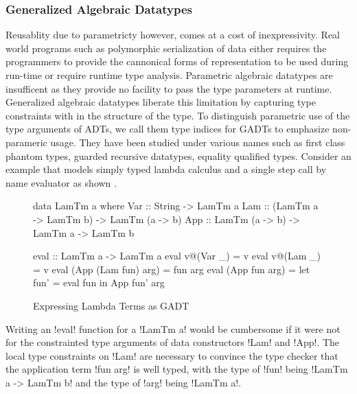 \documentclass[manuscript,screen,nonacm]{acmart}
\begin{document}
\subsubsection{Generalized Algebraic Datatypes}
Reusablity due to parametricty however, comes at a cost of inexpressivity. Real world programs such as polymorphic serialization of data either requires the programmers to provide the cannonical forms of representation \cite{herlihy_value_1982} to be used during run-time or require runtime type analysis\cite{harper_compiling_1995}. Parametric algebraic datatypes are insufficent as they provide no facility to pass the type parameters at runtime. Generalized algebraic datatypes liberate this limitation by capturing type constraints with in the structure of the type. To distinguish parametric use of the type arguments of ADTs, we call them type indices for GADTs to emphasize non-parameric usage. They have been studied under various names such as first class phantom types\citep{cheney_first-class_2003}, guarded recursive datatypes\cite{xi_guarded_2003}, equality qualified types\cite{sheard_meta-programming_2008}. Consider an example that models simply typed lambda calculus and a single step call by name evaluator as shown .
\begin{figure}[ht]
  \centering
  \begin{minipage}[ht]{0.5\linewidth}
    \begin{code}[linemumbers=left]
data LamTm a where
  Var :: String -> LamTm a
  Lam :: (LamTm a -> LamTm b) -> LamTm (a -> b)
  App :: LamTm (a -> b) -> LamTm a -> LamTm b
    \end{code}
  \end{minipage}%
  \begin{minipage}[ht]{0.5\linewidth}
    \begin{code}
      eval :: LamTm a -> LamTm a
      eval v@(Var _) = v
      eval v@(Lam _) = v
      eval (App (Lam fun) arg) = fun arg
      eval (App fun arg) = let fun' = eval fun
                           in App fun' arg
    \end{code}
  \end{minipage}
  \caption{Expressing Lambda Terms as GADT}
  \label{fig:gadt-example}
\end{figure}
Writing an !eval! function for a !LamTm a! would be cumbersome if it were not for the constrainted type arguments of data constructors !Lam! and !App!. The local type constraints on !Lam! are necessary to convince the type checker that the application term !fun arg! is well typed, with the type of !fun! being !LamTm a -> LamTm b! and the type of !arg! being !LamTm a!.
\end{document}
